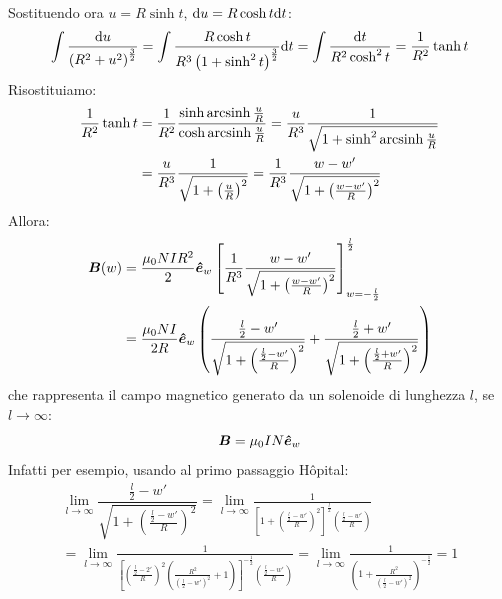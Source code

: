 Sostituendo ora $u=R\sinh t$, $\mathrm{d} u=R\cosh t\mathrm{d} t$:
\begin{equation*}\int\frac{\mathrm{d} u}{\left(R^2+u^2\right)^{\frac{3}{2}}}
=\int\frac{R\cosh t}{R^3\left(1+\sinh^2t\right)^{\frac{3}{2}}}\mathrm{d} t=\int\frac{\mathrm{d} t}{R^2\cosh^2 t}=\frac{1}{R^2}\tanh t\end{equation*}
Risostituiamo:
\begin{align*}
\frac{1}{R^2}\tanh t&=\frac{1}{R^2}\frac{\sinh\operatorname{arcsinh}\frac{u}{R}}{\cosh\operatorname{arcsinh}\frac{u}{R}}=\frac{u}{R^3}\frac{1}{\sqrt{1+\sinh^2\operatorname{arcsinh}\frac{u}{R}}}\\
&=\frac{u}{R^3}\frac{1}{\sqrt{1+\left(\frac{u}{R}\right)^2}}=\frac{1}{R^3}\frac{w-w'}{\sqrt{1+\left(\frac{w-w'}{R}\right)^2}}
\end{align*}
Allora:
\begin{align*}
\boldsymbol{B}(w)&=\frac{\mu_0NIR^2}{2}\boldsymbol{\hat {e}}_w\left[\frac{1}{R^3}\frac{w-w'}{\sqrt{1+\left(\frac{w-w'}{R}\right)^2}}\right]_{w=-\frac{l}{2}}^\frac{l}{2}\\
&=\dfrac{\mu_0NI}{2R}\boldsymbol{\hat {e}}_w\left(\dfrac{\frac{l}{2}-w'}{\sqrt{1+\left(\frac{\frac{l}{2}-w'}{R}\right)^2}}+\dfrac{\frac{l}{2}+w'}{\sqrt{1+\left(\frac{\frac{l}{2}+w'}{R}\right)^2}}\right)
\end{align*}
che rappresenta il campo magnetico generato da un solenoide di lunghezza $l$, se $l\to\infty$:
\begin{equation*}\boldsymbol{B}=\mu_0IN\boldsymbol{\hat {e}}_w\end{equation*}
Infatti per esempio, usando al primo passaggio H\^{o}pital:
\begin{multline*}\lim_{l\to\infty}\dfrac{\frac{l}{2}-w'}{\sqrt{1+\left(\frac{\frac{l}{2}-w'}{R}\right)^2}}=\lim_{l\to\infty}\frac{1}{\left[1+\left(\frac{\frac{l}{2}-w'}{R}\right)^2\right]^{\frac{l}{2}}\left(\frac{\frac{l}{2}-w'}{R}\right)}\\
=\lim_{l\to\infty}\frac{1}{\left[\left(\frac{\frac{l}{2}-2'}{R}\right)^2\left(\frac{R^2}{\left(\frac{l}{2}-w'\right)^2}+1\right)\right]^{-\frac{1}{2}}\left(\frac{\frac{l}{2}-w'}{R}\right)}=\lim_{l\to\infty}\frac{1}{\left(1+\frac{R^2}{\left(\frac{l}{2}-w'\right)^2}\right)^{-\frac{1}{2}}}=1
\end{multline*}
